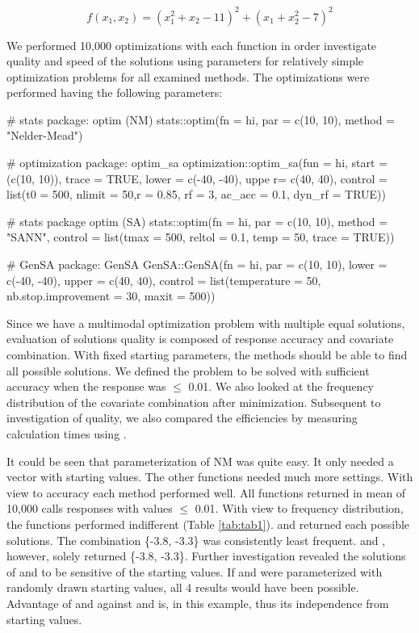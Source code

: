 \begin{equation}
\label{eq:eq2}
f(x_1,x_2)=(x_1^2+x_2-11)^2+(x_1+x_2^2-7)^2
\end{equation}

We performed 10,000 optimizations with each function in order investigate quality and speed of the solutions using parameters for relatively simple optimization problems for all examined methods. The optimizations were performed having the following parameters:

\begin{example}
# stats package: optim (NM)
stats::optim(fn = hi, par = c(10, 10), method = "Nelder-Mead")
	
# optimization package: optim_sa
optimization::optim_sa(fun = hi, start = (c(10, 10)), trace = TRUE, 
	lower = c(-40, -40), uppe r= c(40, 40),
		control = list(t0 = 500, nlimit = 50,r = 0.85,
		rf = 3, ac_acc = 0.1, dyn_rf = TRUE))

# stats package optim (SA)
stats::optim(fn = hi, par = c(10, 10), method = "SANN",
	control = list(tmax = 500, reltol = 0.1, temp = 50, trace = TRUE))

# GenSA package: GenSA
GenSA::GenSA(fn = hi, par = c(10, 10), lower = c(-40, -40), upper = c(40, 40), 
	control = list(temperature = 50, nb.stop.improvement = 30, maxit = 500))
\end{example}
Since we have a multimodal optimization problem with multiple equal solutions, evaluation of solutions quality is composed of response accuracy and covariate combination. With fixed starting parameters, the methods should be able to find all possible solutions. We defined the problem to be solved with sufficient accuracy when the response was $\leq$ 0.01. We also looked at the frequency distribution of the covariate combination after minimization. Subsequent to investigation of quality, we also compared the efficiencies by measuring calculation times using .

It could be seen that parameterization of NM was quite easy. It only needed a vector with starting values. The other functions needed much more settings. With view to accuracy each method performed well. All functions returned in mean of 10,000 calls responses with values $\leq$ 0.01. With view to frequency distribution, the functions performed indifferent (Table \ref{tab:tab1}).  and  returned each possible solutions.  The combination \{-3.8, -3.3\} was consistently least frequent.  and , however, solely returned \{-3.8, -3.3\}. Further investigation revealed the solutions of  and  to be sensitive of the starting values. If  and  were parameterized with randomly drawn starting values, all 4 results would have been possible. Advantage of  and  against  and  is, in this example, thus its independence from starting values.

